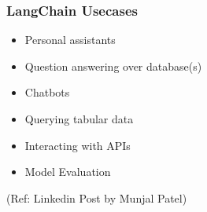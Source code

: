 






				  



\begin{frame}\frametitle{LangChain Usecases}

\begin{itemize}
\item Personal assistants
\item Question answering over database(s)
\item Chatbots
\item Querying tabular data
\item Interacting with APIs
\item Model Evaluation
\end{itemize}


{\tiny (Ref: Linkedin Post by Munjal Patel)}
\end{frame}


